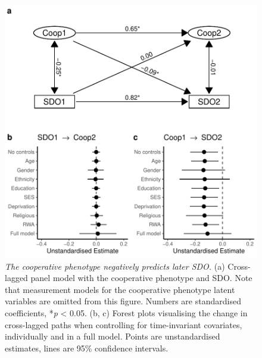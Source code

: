 \documentclass[
  man,floatsintext]{apa6}
\begin{document}
\begin{figure}
\centering
\includegraphics{manuscript_files/figure-latex/clpmPlotSDO-1.pdf}
\caption{\label{fig:clpmPlotSDO}\emph{The cooperative phenotype negatively predicts later SDO.} (a) Cross-lagged panel model with the cooperative phenotype and SDO. Note that measurement models for the cooperative phenotype latent variables are omitted from this figure. Numbers are standardised coefficients, *\emph{p} \textless{} 0.05. (b, c) Forest plots visualising the change in cross-lagged paths when controlling for time-invariant covariates, individually and in a full model. Points are unstandardised estimates, lines are 95\% confidence intervals.}
\end{figure}
\end{document}
